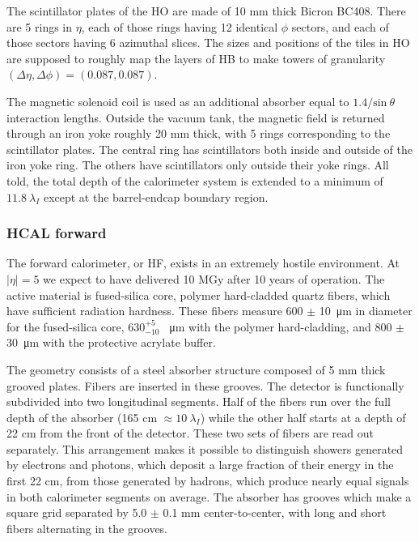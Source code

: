 The scintillator plates of the HO are made of 10 mm thick Bicron BC408. There are 5 rings in $\eta$, each of those rings having 12 identical $\phi$ sectors, and each of those sectors having 6 azimuthal slices.
The sizes and positions of the tiles in HO are supposed to roughly map the layers of HB
to make towers of granularity $(\Delta\eta, \Delta\phi) = (0.087, 0.087)$.

The magnetic solenoid coil is used as an additional absorber equal to $1.4/\textrm{sin}\:\theta$ interaction lengths.
Outside the vacuum tank, the magnetic field is returned through an iron yoke roughly 20 mm thick, with 5 rings corresponding to the scintillator plates.
The central ring has scintillators both inside and outside of the iron yoke ring.
The others have scintillators only outside their yoke rings.
All told, the total depth of the calorimeter system is extended to a minimum of
$11.8\:\lambda_I$ except at the barrel-endcap boundary region.

\subsubsection{HCAL forward}
The forward calorimeter, or HF, exists in an extremely hostile environment. 
At $|\eta|=5$ we expect to have delivered 10 MGy after 10 years of operation.
The active material is fused-silica core, polymer hard-cladded quartz fibers, which have sufficient radiation hardness.
These fibers measure 600 $\pm$ \SI{10}{\micro\meter} in diameter for the fused-silica core,
$ {630}^{+5}_{-10}$ \SI{}{\micro\meter} with the polymer hard-cladding, 
and 800 $\pm$ \SI{30}{\micro\meter} with the protective acrylate buffer.

The geometry consists of a steel absorber structure composed of 5 mm thick grooved
plates. Fibers are inserted in these grooves.
The detector is functionally subdivided into two longitudinal segments. 
Half of the fibers run over the full depth of the absorber (165 cm $\approx 10\:\lambda_I$)
while the other half starts at a depth of 22 cm from the front of the detector.
These two sets of fibers are read out separately. 
This arrangement makes it possible to distinguish showers generated by electrons and photons,
which deposit a large fraction of their energy in the first 22 cm,
from those generated by hadrons, which produce nearly equal signals in both calorimeter segments on average. 
The absorber has grooves which make a square grid separated by 5.0 $\pm$ 0.1 mm center-to-center, with long and short fibers alternating in the grooves. 


